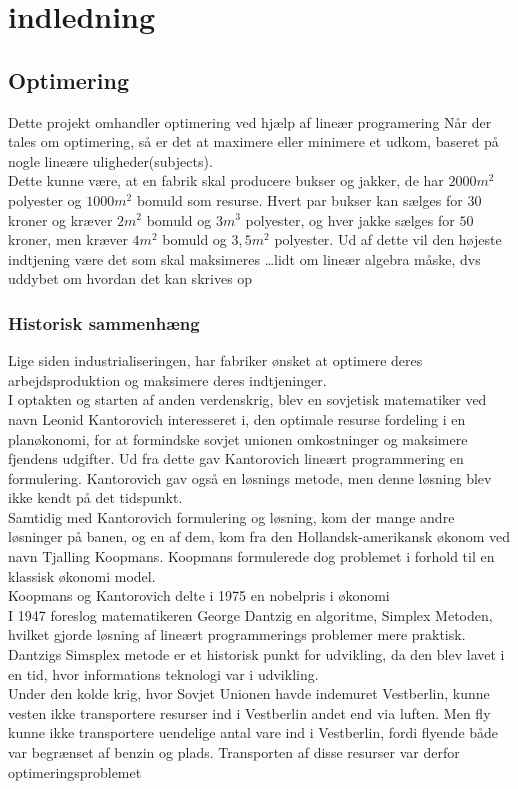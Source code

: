 \chapter{indledning}
\section{Optimering}
Dette projekt omhandler optimering ved hjælp af lineær programering %
Når der tales om optimering, så er det at maximere eller minimere et udkom, baseret på nogle lineære uligheder(subjects). \\
Dette kunne være, at en fabrik skal producere bukser og jakker, de har $2000m^2$ polyester og $1000m^2$ bomuld som resurse.
Hvert par bukser kan sælges for $30$ kroner og kræver $2m^2$ bomuld og $3m^3$ polyester, og hver jakke sælges for $50$ kroner, men kræver $4m^2$ bomuld og $3,5m^2$ polyester. Ud af dette vil den højeste indtjening være det som skal maksimeres …lidt om lineær algebra måske, dvs uddybet om hvordan det kan skrives op \\
\subsection{Historisk sammenhæng}
Lige siden industrialiseringen, har fabriker ønsket at optimere deres arbejdsproduktion og maksimere deres indtjeninger. \\ %
I optakten og starten af anden verdenskrig, blev en sovjetisk matematiker ved navn Leonid Kantorovich interesseret i, den optimale resurse fordeling i en planøkonomi, for at formindske sovjet unionen omkostninger og maksimere fjendens udgifter. Ud fra dette gav Kantorovich lineært programmering en formulering. Kantorovich gav også en løsnings metode, men denne løsning blev ikke kendt på det tidspunkt.\\
Samtidig med Kantorovich formulering og løsning, kom der mange andre løsninger på banen, og en af dem, kom fra den Hollandsk-amerikansk økonom ved navn Tjalling Koopmans. Koopmans formulerede dog problemet i forhold til en klassisk økonomi model.\\
Koopmans og Kantorovich delte i 1975 en nobelpris i økonomi\\
I 1947 foreslog matematikeren George Dantzig en algoritme, Simplex Metoden, hvilket gjorde løsning af lineært programmerings problemer mere praktisk.\\
Dantzigs Simsplex metode er et historisk punkt for udvikling, da den blev lavet i en tid, hvor informations teknologi var i udvikling.
\\%
Under den kolde krig, hvor Sovjet Unionen havde indemuret Vestberlin, kunne vesten ikke transportere resurser ind i Vestberlin andet end via luften. Men fly kunne ikke transportere uendelige antal vare ind i Vestberlin, fordi flyende både var begrænset af benzin og plads. Transporten af disse resurser var derfor optimeringsproblemet


